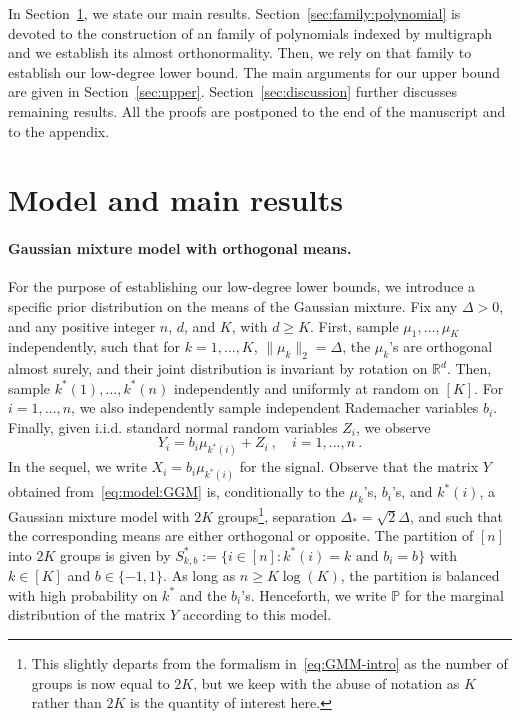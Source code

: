 \documentclass{article}
\begin{document}
In Section~\ref{sec:main_results}, we state our main results. 
 Section~\ref{sec:family:polynomial} is devoted to the construction of an family of polynomials indexed by multigraph and we establish its almost orthonormality. Then, we rely on that family to establish our low-degree lower bound. The main arguments for our upper bound are given in Section~\ref{sec:upper}. Section~\ref{sec:discussion} further discusses remaining results. All the proofs are postponed to the end of the manuscript and to the appendix. 









\section{Model and main results}\label{sec:main_results}



\paragraph{Gaussian mixture model with orthogonal means.} For the purpose of establishing our low-degree lower bounds, we introduce a specific prior distribution on the means of the Gaussian mixture. Fix any $\Delta>0$, and any positive integer $n$, $d$, and $K$, with $d\geq K$.  
First, sample $\mu_1,\ldots, \mu_K$ independently, such that for $k=1,\ldots, K$, $\|\mu_k\|_2= \Delta$, the $\mu_k$'s are orthogonal almost surely, and their joint distribution is invariant by rotation on $\mathbb{R}^d$. Then, sample $k^*(1),\ldots, k^*(n)$ independently and uniformly at random on $[K]$. For $i=1,\ldots, n$, we also independently sample independent Rademacher variables $b_i$. Finally, given i.i.d. standard normal random variables $Z_i$, 
we observe
\begin{equation}\label{eq:model:GGM}
Y_i =  b_i \mu_{k^*(i)} + Z_i \ , \quad i=1,\ldots, n\ .
\end{equation}
In the sequel, we write $X_i= b_i\mu_{k^*(i)}$ for the signal. Observe that the matrix $Y$ obtained from~\eqref{eq:model:GGM} is, conditionally to the $\mu_k$'s, $b_i$'s, and $k^*(i)$, a Gaussian mixture model with $2K$ groups\footnote{This slightly departs from the formalism in~\eqref{eq:GMM-intro} as the number of groups is now equal to $2K$, but we keep with the abuse of notation as $K$ rather than $2K$ is the quantity of interest here.}, separation $\Delta_* = \sqrt{2}\Delta$, and such that the corresponding means are either orthogonal or opposite. The partition of $[n]$ into $2K$ groups is given by $S^*_{k,b}:= \{i\in [n]: k^*(i)=k\text{ and }b_i= b\}$ with $k\in [K]$ and $b\in \{-1,1\}$. As long as $n\geq K\log(K)$, the partition is balanced with high probability on $k^*$ and the $b_i$'s.  Henceforth, we write $\mathbb{P}$ for the marginal distribution of the matrix $Y$ according to this model. 
\end{document}
